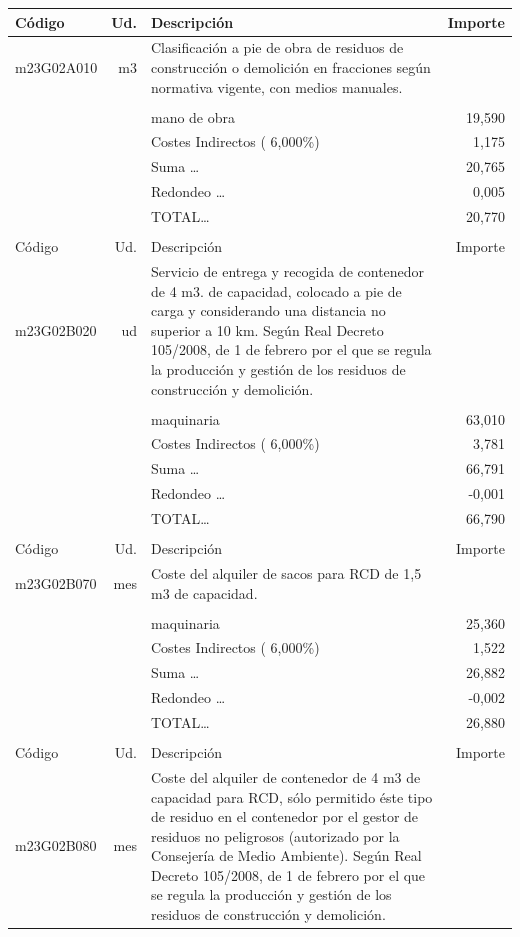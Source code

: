 \documentclass{book}%
\begin{document}
\begin{supertabular}{l r p{60mm} r}
Código&Ud.&Descripción&Importe\\%
\hline%
m23G02A010&m3&Clasificación a pie de obra de residuos de construcción o demolición en fracciones según normativa vigente, con medios manuales.&\\%
&&&\\%
&&mano de obra&    19,590\\%
&&Costes Indirectos (     6,000\%)&     1,175\\%
&&Suma \ldots&    20,765\\%
&&Redondeo \ldots&     0,005\\%
%
&&TOTAL\ldots&    20,770\\%
&&&\\%
Código&Ud.&Descripción&Importe\\%
\hline%
m23G02B020&ud&Servicio de entrega y recogida de contenedor de 4 m3. de capacidad, colocado a pie de carga y considerando una distancia no superior a 10 km. Según Real Decreto 105/2008, de 1 de febrero por el que se regula la producción y gestión de los residuos de construcción y demolición.&\\%
&&&\\%
&&maquinaria&    63,010\\%
&&Costes Indirectos (     6,000\%)&     3,781\\%
&&Suma \ldots&    66,791\\%
&&Redondeo \ldots&    {-}0,001\\%
%
&&TOTAL\ldots&    66,790\\%
&&&\\%
Código&Ud.&Descripción&Importe\\%
\hline%
m23G02B070&mes&Coste del alquiler de sacos para RCD de 1,5 m3 de capacidad.&\\%
&&&\\%
&&maquinaria&    25,360\\%
&&Costes Indirectos (     6,000\%)&     1,522\\%
&&Suma \ldots&    26,882\\%
&&Redondeo \ldots&    {-}0,002\\%
%
&&TOTAL\ldots&    26,880\\%
&&&\\%
Código&Ud.&Descripción&Importe\\%
\hline%
m23G02B080&mes&Coste del alquiler de contenedor de 4 m3 de capacidad para RCD, sólo permitido éste tipo de residuo en el contenedor por el gestor de residuos no peligrosos (autorizado por la Consejería de Medio Ambiente). Según Real Decreto 105/2008, de 1 de febrero por el que se regula la producción y gestión de los residuos de construcción y demolición.&\\%

\end{supertabular}
\end{document}
